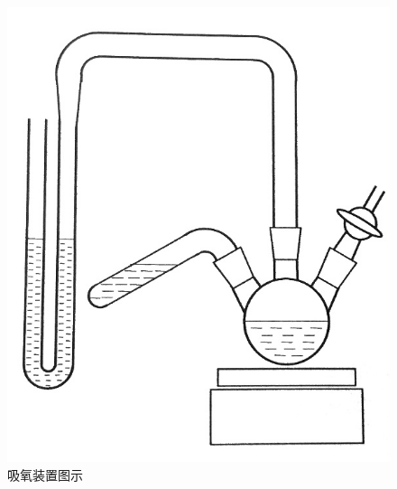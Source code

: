\documentclass[a4paper,zihao=5,UTF8]{ctexart}
\begin{document}
    \begin{figure}[htbp]
        \centering 
        \includegraphics[scale=0.7]{xiyangzhuangzhi.png}
        \caption{吸氧装置图示}
        \label{xiyangzhuangzhi}
    \end{figure}
\end{document}
